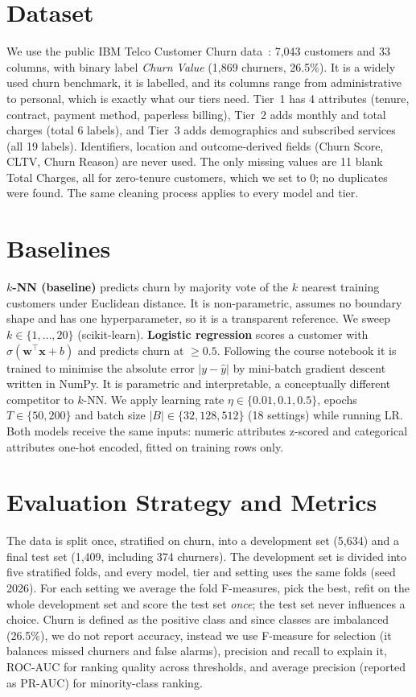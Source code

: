\documentclass[sigconf,nonacm]{acmart}
\begin{document}
\section{Dataset}
We use the public IBM Telco Customer Churn data~\cite{ibmtelco}: 7,043 customers and 33 columns, with binary label \emph{Churn Value} (1,869 churners, 26.5\%). It is a widely used churn benchmark, it is labelled, and its columns range from administrative to personal, which is exactly what our tiers need. Tier~1 has 4 attributes (tenure, contract, payment method, paperless billing), Tier~2 adds monthly and total charges (total 6 labels), and Tier~3 adds demographics and subscribed services (all 19 labels). Identifiers, location and outcome-derived fields (Churn Score, CLTV, Churn Reason) are never used. The only missing values are 11 blank Total Charges, all for zero-tenure customers, which we set to 0; no duplicates were found. The same cleaning process applies to every model and tier.

\section{Baselines}
\textbf{$k$-NN (baseline)} predicts churn by majority vote of the $k$ nearest training customers under Euclidean distance. It is non-parametric, assumes no boundary shape and has one hyperparameter, so it is a transparent reference. We sweep $k\in\{1,\dots,20\}$ (scikit-learn).
\textbf{Logistic regression} scores a customer with $\sigma(\mathbf{w}^\top\mathbf{x}+b)$ and predicts churn at $\ge0.5$. Following the course notebook it is trained to minimise the absolute error $|y-\hat y|$ by mini-batch gradient descent written in NumPy. It is parametric and interpretable, a conceptually different competitor to $k$-NN. We apply learning rate $\eta\in\{0.01,0.1,0.5\}$, epochs $T\in\{50,200\}$ and batch size $|B|\in\{32,128,512\}$ (18 settings) while running LR. Both models receive the same inputs: numeric attributes z-scored and categorical attributes one-hot encoded, fitted on training rows only.

\section{Evaluation Strategy and Metrics}
The data is split once, stratified on churn, into a development set (5,634) and a final test set (1,409, including 374 churners). The development set is divided into five stratified folds, and every model, tier and setting uses the same folds (seed 2026). For each setting we average the fold F-measures, pick the best, refit on the whole development set and score the test set \emph{once}; the test set never influences a choice. Churn is defined as the positive class and since classes are imbalanced (26.5\%), we do not report accuracy, instead we use F-measure for selection (it balances missed churners and false alarms), precision and recall to explain it, ROC-AUC for ranking quality across thresholds, and average precision (reported as PR-AUC) for minority-class ranking.
\end{document}
